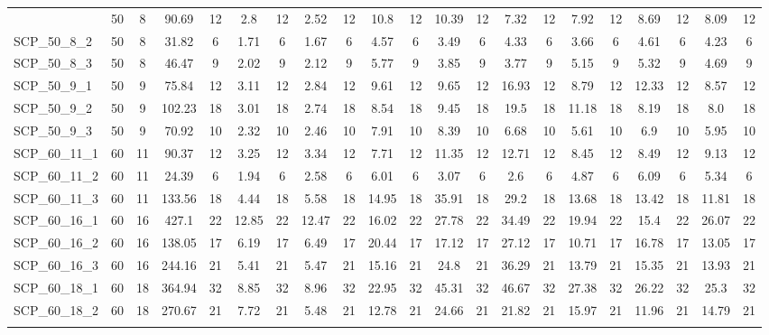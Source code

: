 \begin{sidewaystable}[!ht]
{\begin{tabular}{lcccccccccccccccccccc}
{SCP\_50\_8\_1 & 50 & 8 & 90.69 & 12 & 2.8 & 12 &  \textcolor{blue2}{2.52} & 12 & 10.8 & 12 & 10.39 & 12 & 7.32 & 12 & 7.92 & 12 & 8.69 & 12 & 8.09 & 12 \\
SCP\_50\_8\_2 & 50 & 8 & 31.82 & 6 & 1.71 & 6 &  \textcolor{blue2}{1.67} & 6 & 4.57 & 6 & 3.49 & 6 & 4.33 & 6 & 3.66 & 6 & 4.61 & 6 & 4.23 & 6 \\
SCP\_50\_8\_3 & 50 & 8 & 46.47 & 9 &  \textcolor{blue2}{2.02} & 9 & 2.12 & 9 & 5.77 & 9 & 3.85 & 9 & 3.77 & 9 & 5.15 & 9 & 5.32 & 9 & 4.69 & 9 \\
SCP\_50\_9\_1 & 50 & 9 & 75.84 & 12 & 3.11 & 12 &  \textcolor{blue2}{2.84} & 12 & 9.61 & 12 & 9.65 & 12 & 16.93 & 12 & 8.79 & 12 & 12.33 & 12 & 8.57 & 12 \\
SCP\_50\_9\_2 & 50 & 9 & 102.23 & 18 & 3.01 & 18 &  \textcolor{blue2}{2.74} & 18 & 8.54 & 18 & 9.45 & 18 & 19.5 & 18 & 11.18 & 18 & 8.19 & 18 & 8.0 & 18 \\
SCP\_50\_9\_3 & 50 & 9 & 70.92 & 10 &  \textcolor{blue2}{2.32} & 10 & 2.46 & 10 & 7.91 & 10 & 8.39 & 10 & 6.68 & 10 & 5.61 & 10 & 6.9 & 10 & 5.95 & 10 \\
SCP\_60\_11\_1 & 60 & 11 & 90.37 & 12 &  \textcolor{blue2}{3.25} & 12 & 3.34 & 12 & 7.71 & 12 & 11.35 & 12 & 12.71 & 12 & 8.45 & 12 & 8.49 & 12 & 9.13 & 12 \\
SCP\_60\_11\_2 & 60 & 11 & 24.39 & 6 &  \textcolor{blue2}{1.94} & 6 & 2.58 & 6 & 6.01 & 6 & 3.07 & 6 & 2.6 & 6 & 4.87 & 6 & 6.09 & 6 & 5.34 & 6 \\
SCP\_60\_11\_3 & 60 & 11 & 133.56 & 18 &  \textcolor{blue2}{4.44} & 18 & 5.58 & 18 & 14.95 & 18 & 35.91 & 18 & 29.2 & 18 & 13.68 & 18 & 13.42 & 18 & 11.81 & 18 \\
SCP\_60\_16\_1 & 60 & 16 & 427.1 & 22 & 12.85 & 22 &  \textcolor{blue2}{12.47} & 22 & 16.02 & 22 & 27.78 & 22 & 34.49 & 22 & 19.94 & 22 & 15.4 & 22 & 26.07 & 22 \\
SCP\_60\_16\_2 & 60 & 16 & 138.05 & 17 &  \textcolor{blue2}{6.19} & 17 & 6.49 & 17 & 20.44 & 17 & 17.12 & 17 & 27.12 & 17 & 10.71 & 17 & 16.78 & 17 & 13.05 & 17 \\
SCP\_60\_16\_3 & 60 & 16 & 244.16 & 21 &  \textcolor{blue2}{5.41} & 21 & 5.47 & 21 & 15.16 & 21 & 24.8 & 21 & 36.29 & 21 & 13.79 & 21 & 15.35 & 21 & 13.93 & 21 \\
SCP\_60\_18\_1 & 60 & 18 & 364.94 & 32 &  \textcolor{blue2}{8.85} & 32 & 8.96 & 32 & 22.95 & 32 & 45.31 & 32 & 46.67 & 32 & 27.38 & 32 & 26.22 & 32 & 25.3 & 32 \\
SCP\_60\_18\_2 & 60 & 18 & 270.67 & 21 & 7.72 & 21 &  \textcolor{blue2}{5.48} & 21 & 12.78 & 21 & 24.66 & 21 & 21.82 & 21 & 15.97 & 21 & 11.96 & 21 & 14.79 & 21 \\
}
\end{tabular}}
\end{sidewaystable}
